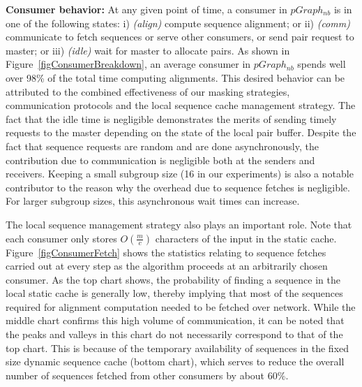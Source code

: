 \documentclass[10pt,journal,letterpaper,compsoc]{IEEEtran}
\begin{document}
{\bf Consumer behavior: } At any given point of time, a consumer in $pGraph_{nb}$ is in one of the following states: i) \emph{(align)} compute sequence alignment; or ii) \emph{(comm)} communicate to fetch sequences or serve other consumers, or send pair request to master; or iii) \emph{(idle)} wait for master to allocate pairs. As shown in Figure~\ref{figConsumerBreakdown}, an average consumer in $pGraph_{nb}$ spends well over 98\% of the total time computing alignments. This desired behavior can be attributed to the combined effectiveness of our masking strategies, communication protocols and the local sequence cache management strategy. The fact that the idle time is negligible demonstrates the merits of sending timely requests to the master depending on the state of the local pair buffer. Despite the fact that sequence requests are random and are done asynchronously, the contribution due to communication is negligible both at the senders and receivers. Keeping a small subgroup size (16 in our experiments) is also a notable contributor to the reason why the overhead due to sequence fetches is negligible. For larger subgroup sizes, this asynchronous wait times can increase.

The local sequence management strategy also plays an important role. Note that each consumer only stores $O(\frac{m}{c})$ characters of the input in the static cache. Figure~\ref{figConsumerFetch} shows the statistics relating to sequence fetches carried out at every step as the algorithm proceeds at an arbitrarily chosen consumer. As the top chart shows, the probability of finding a sequence in the local static cache is generally low, thereby implying that most of the sequences required for alignment computation needed to be fetched over network. While the middle chart confirms this high volume of communication, it can be noted that the peaks and valleys in this chart do not necessarily correspond to that of the top chart. This is because of the temporary availability of sequences in the fixed size dynamic sequence cache (bottom chart), which serves to reduce the overall number of sequences fetched from other consumers by about 60\%.
 
\end{document}
